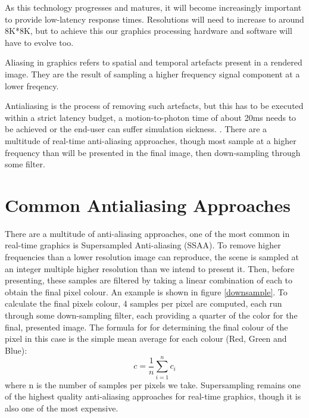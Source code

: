 \documentclass[12pt,a4paper,twoside,openright]{report}
\begin{document}
As this technology progresses and matures, it will become increasingly important to provide low-latency response times. Resolutions will need to increase to around 8K*8K\cite{abrash}, but to achieve this our graphics processing hardware and software will have to evolve too.

Aliasing in graphics refers to spatial and temporal artefacts present in a rendered image. They are the result of sampling a higher frequency signal component at a lower freqency.

Antialiasing is the process of removing such artefacts, but this has to be executed within a strict latency budget, a motion-to-photon time of about 20ms needs to be achieved or the end-user can suffer simulation sickness. \cite{MotionToPhoton}.
There are a multitude of real-time anti-aliasing approaches, though most sample at a higher frequency than will be presented in the final image, then down-sampling through some filter. 

\section{Common Antialiasing Approaches}\label{supersampling}

There are a multitude of anti-aliasing approaches, one of the most common in real-time graphics is Supersampled Anti-aliasing (SSAA). To remove higher frequencies than a lower resolution image can reproduce, the scene is sampled at an integer multiple higher resolution than we intend to present it.
Then, before presenting, these samples are filtered by taking a linear combination of each to obtain the final pixel colour. An example is shown in figure \ref{downsample}. To calculate the final pixels colour, 4 samples per pixel are computed, each run through some down-sampling filter, each providing a quarter of the color for the final, presented image. The formula for for determining the final colour of the pixel in this case is the simple mean average for each colour (Red, Green and Blue):
$$ c = \frac{1}{n}\displaystyle\sum_{i=1}^n c_i $$ where n is the number of samples per pixels we take. Supersampling remains one of the highest quality anti-aliasing approaches for real-time graphics, though it is also one of the most expensive. 
\end{document}
